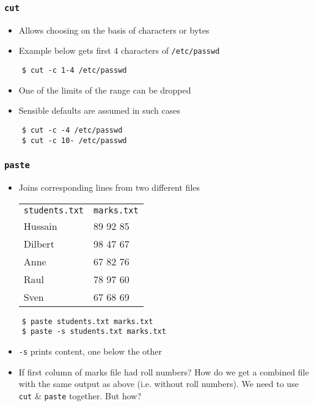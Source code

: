 \documentclass[12pt,compress]{beamer}
\begin{document}
\begin{frame}[fragile]
  \frametitle{\texttt{cut}}
  \begin{itemize}
  \item Allows choosing on the basis of characters or bytes
  \item Example below gets first 4 characters of \texttt{/etc/passwd}
  \end{itemize}
  \begin{lstlisting}
    $ cut -c 1-4 /etc/passwd
  \end{lstlisting} %
  \begin{itemize}
  \item One of the limits of the range can be dropped
  \item Sensible defaults are assumed in such cases
  \end{itemize}
  \begin{lstlisting}
    $ cut -c -4 /etc/passwd
    $ cut -c 10- /etc/passwd
  \end{lstlisting} %
\end{frame}

\begin{frame}[fragile]
  \frametitle{\texttt{paste}}
  \begin{itemize}
  \item Joins corresponding lines from two different files
    \begin{center}
      \begin{tabular}{l|l}
        \verb~students.txt~  &  \verb~marks.txt~  \\
        Hussain              &  89 92 85          \\
        Dilbert              &  98 47 67          \\
        Anne                 &  67 82 76          \\
        Raul                 &  78 97 60          \\
        Sven                 &  67 68 69          \\
      \end{tabular}
    \end{center}
  \end{itemize}
  \begin{lstlisting}
    $ paste students.txt marks.txt 
    $ paste -s students.txt marks.txt
  \end{lstlisting}
  \begin{itemize}
  \item \texttt{-s} prints content, one below the other
  \item If first column of marks file had roll numbers? How do we get
    a combined file with the same output as above (i.e. without roll
    numbers). We need to use \texttt{cut} \& \texttt{paste} together.
    But how?
  \end{itemize}
\end{frame}
\end{document}
